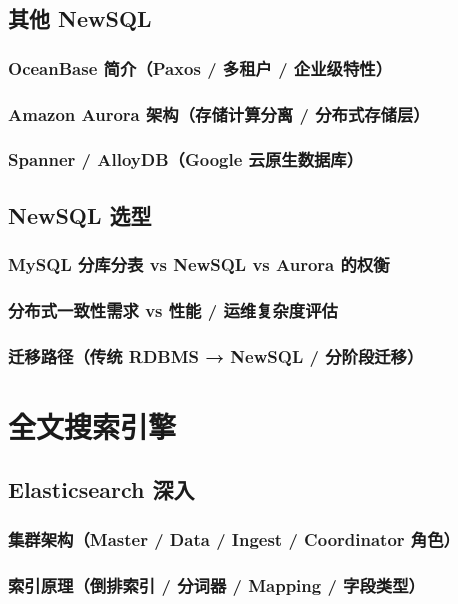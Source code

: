\documentclass[12pt,UTF8]{ctexbook}
\begin{document}
  \section{其他 NewSQL}
    \subsection{OceanBase 简介（Paxos / 多租户 / 企业级特性）}
    \subsection{Amazon Aurora 架构（存储计算分离 / 分布式存储层）}
    \subsection{Spanner / AlloyDB（Google 云原生数据库）}

  \section{NewSQL 选型}
    \subsection{MySQL 分库分表 vs NewSQL vs Aurora 的权衡}
    \subsection{分布式一致性需求 vs 性能 / 运维复杂度评估}
    \subsection{迁移路径（传统 RDBMS → NewSQL / 分阶段迁移）}


\chapter{全文搜索引擎}
\label{chap:search-engine}

  \section{Elasticsearch 深入}
    \subsection{集群架构（Master / Data / Ingest / Coordinator 角色）}
    \subsection{索引原理（倒排索引 / 分词器 / Mapping / 字段类型）}
\end{document}

